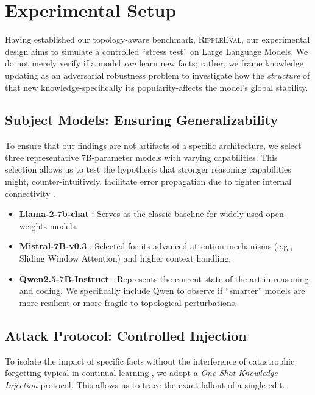 \section{Experimental Setup}
\label{sec:setup}


Having established our topology-aware benchmark, \textsc{RippleEval}, our experimental design aims to simulate a controlled ``stress test''  on Large Language Models. We do not merely verify if a model \textit{can} learn new facts; rather, we frame knowledge updating as an adversarial robustness problem to investigate how the \textit{structure} of that new knowledge-specifically its popularity-affects the model's global stability.

\subsection{Subject Models: Ensuring Generalizability}
To ensure that our findings are not artifacts of a specific architecture, we select three representative 7B-parameter models with varying capabilities. This selection allows us to test the hypothesis that stronger reasoning capabilities might, counter-intuitively, facilitate error propagation due to tighter internal connectivity \cite{wei2022chain}.
\begin{itemize}
    \item \textbf{Llama-2-7b-chat} \cite{touvron2023llama2}: Serves as the classic baseline for widely used open-weights models.
    \item \textbf{Mistral-7B-v0.3} \cite{jiang2023mistral}: Selected for its advanced attention mechanisms (e.g., Sliding Window Attention) and higher context handling.
    \item \textbf{Qwen2.5-7B-Instruct} \cite{bai2023qwen}: Represents the current state-of-the-art in reasoning and coding. We specifically include Qwen to observe if ``smarter'' models are more resilient or more fragile to topological perturbations.
\end{itemize}

\subsection{Attack Protocol: Controlled Injection}
To isolate the impact of specific facts without the interference of catastrophic forgetting typical in continual learning \cite{kirkpatrick2017overcoming}, we adopt a \textit{One-Shot Knowledge Injection} protocol. This allows us to trace the exact fallout of a single edit.

